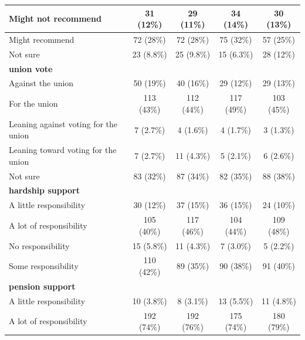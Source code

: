 \documentclass[
  11pt,
  oneside]{article}
\begin{document}
\begin{table}
\begin{tabular}[t]{l|c|c|c|c}
\hline
\hspace{1em}Might not recommend & 31 (12\%) & 29 (11\%) & 34 (14\%) & 30 (13\%)\\
\hline
\hspace{1em}Might recommend & 72 (28\%) & 72 (28\%) & 75 (32\%) & 57 (25\%)\\
\hline
\hspace{1em}Not sure & 23 (8.8\%) & 25 (9.8\%) & 15 (6.3\%) & 28 (12\%)\\
\hline
\textbf{union vote} &  &  &  & \\
\hline
\hspace{1em}Against the union & 50 (19\%) & 40 (16\%) & 29 (12\%) & 29 (13\%)\\
\hline
\hspace{1em}For the union & 113 (43\%) & 112 (44\%) & 117 (49\%) & 103 (45\%)\\
\hline
\hspace{1em}Leaning against voting for the union & 7 (2.7\%) & 4 (1.6\%) & 4 (1.7\%) & 3 (1.3\%)\\
\hline
\hspace{1em}Leaning toward voting for the union & 7 (2.7\%) & 11 (4.3\%) & 5 (2.1\%) & 6 (2.6\%)\\
\hline
\hspace{1em}Not sure & 83 (32\%) & 87 (34\%) & 82 (35\%) & 88 (38\%)\\
\hline
\textbf{hardship support} &  &  &  & \\
\hline
\hspace{1em}A little responsibility & 30 (12\%) & 37 (15\%) & 36 (15\%) & 24 (10\%)\\
\hline
\hspace{1em}A lot of responsibility & 105 (40\%) & 117 (46\%) & 104 (44\%) & 109 (48\%)\\
\hline
\hspace{1em}No responsibility & 15 (5.8\%) & 11 (4.3\%) & 7 (3.0\%) & 5 (2.2\%)\\
\hline
\hspace{1em}Some responsibility & 110 (42\%) & 89 (35\%) & 90 (38\%) & 91 (40\%)\\
\hline
\textbf{pension support} &  &  &  & \\
\hline
\hspace{1em}A little responsibility & 10 (3.8\%) & 8 (3.1\%) & 13 (5.5\%) & 11 (4.8\%)\\
\hline
\hspace{1em}A lot of responsibility & 192 (74\%) & 192 (76\%) & 175 (74\%) & 180 (79\%)\\

\end{tabular}
\end{table}
\end{document}
